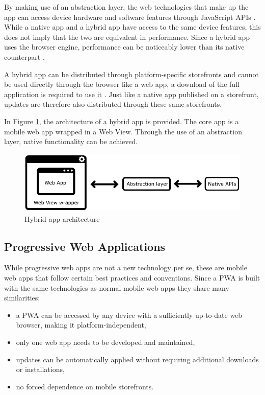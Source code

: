 \documentclass[a4paper,12pt]{article}
\begin{document}
By making use of an abstraction layer, the web technologies that make up the app can access device hardware and software features through JavaScript APIs \cite{crossplatform_2012}. While a native app and a hybrid app have access to the same device features, this does not imply that the two are equivalent in performance. Since a hybrid app uses the browser engine, performance can be noticeably lower than its native counterpart \cite{crossplatform_taxonomy, crossplatform_2012}.

A hybrid app can be distributed through platform-specific storefronts and cannot be used directly through the browser like a web app, a download of the full application is required to use it \cite{crossplatform_2012, mobile_web_apps_2013}. Just like a native app published on a storefront, updates are therefore also distributed through these same storefronts.

In Figure \ref{fig:hybridapp}, the architecture of a hybrid app is provided. The core app is a mobile web app wrapped in a Web View. Through the use of an abstraction layer, native functionality can be achieved.

\begin{figure}[h]%
	\centering
	\includegraphics[height=3cm]{img/Other/struct_hybrid.png}
	\caption{Hybrid app architecture}%
	\label{fig:hybridapp}%
\end{figure}

\vspace{-4px}
\subsection{Progressive Web Applications}
\label{Theory_PWA}
While progressive web apps are not a new technology per se, these are mobile web apps that follow certain best practices and conventions. Since a PWA is built with the same technologies as normal mobile web apps they share many similarities:

\begin{itemize}
    \item \vspace{-4px}a PWA can be accessed by any device with a sufficiently up-to-date web browser, making it platform-independent,
    \item \vspace{-4px}only one web app needs to be developed and maintained,
    \item updates can be automatically applied without requiring additional downloads or installations,
    \item \vspace{-4px}no forced dependence on mobile storefronts.
\end{itemize}
\end{document}
